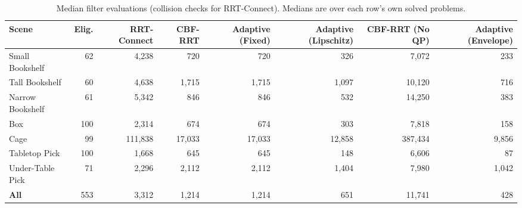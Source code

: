\begin{table}[t]
  \centering
  \caption{Median filter evaluations (collision checks for RRT-Connect). Medians are over each row's own solved problems.}
  \label{tab:mbm-per-scene-evaluations}
  \small
  \begin{tabular}{lrrrrrrr}
    \toprule
    Scene & Elig. & RRT-Connect & CBF-RRT & Adaptive (Fixed) & Adaptive (Lipschitz) & CBF-RRT (No QP) & Adaptive (Envelope) \\
    \midrule
    Small Bookshelf & 62 & 4,238 & 720 & 720 & 326 & 7,072 & 233 \\
    Tall Bookshelf & 60 & 4,638 & 1,715 & 1,715 & 1,097 & 10,120 & 716 \\
    Narrow Bookshelf & 61 & 5,342 & 846 & 846 & 532 & 14,250 & 383 \\
    Box & 100 & 2,314 & 674 & 674 & 303 & 7,818 & 158 \\
    Cage & 99 & 111,838 & 17,033 & 17,033 & 12,858 & 387,434 & 9,856 \\
    Tabletop Pick & 100 & 1,668 & 645 & 645 & 148 & 6,606 & 87 \\
    Under-Table Pick & 71 & 2,296 & 2,112 & 2,112 & 1,404 & 7,980 & 1,042 \\
    \midrule
    \textbf{All} & 553 & 3,312 & 1,214 & 1,214 & 651 & 11,741 & 428 \\
    \bottomrule
  \end{tabular}
\end{table}
